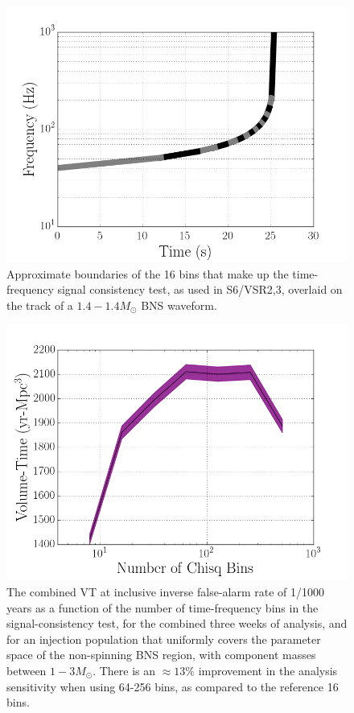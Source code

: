 \begin{figure}
\centering
\includegraphics[width=1.0\textwidth]{papers/bns_o1_dev/figures/bin.png}
\caption{\label{fig:chisqbins} 
Approximate boundaries of the 16 bins that make up the time-frequency signal consistency test, as used in S6/VSR2,3, overlaid on the track of a $1.4-1.4M_{\odot}$ BNS waveform. 
}
\end{figure}

\begin{figure}
\centering
\includegraphics[width=1.0\textwidth]{papers/bns_o1_dev/figures/cb.png}
\caption{\label{fig:vbin} 
The combined VT at inclusive inverse false-alarm rate of 1/1000 years as a function of the number of time-frequency bins in the signal-consistency test, for the combined three weeks of analysis, and for an injection population that uniformly covers the parameter space of the non-spinning BNS region, with component masses between $1- 3M_\odot$. There is an $\approx 13\% $ improvement in the analysis sensitivity when using 64-256 bins, as compared to the reference 16 bins.
}
\end{figure}

